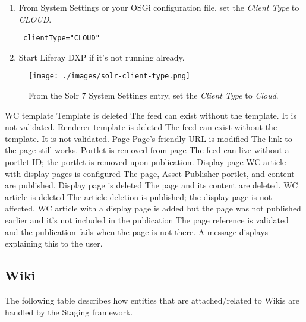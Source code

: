 \begin{enumerate}
\def\labelenumi{\arabic{enumi}.}
\item
  From System Settings or your OSGi configuration file, set the
  \emph{Client Type} to \emph{CLOUD}.

\begin{verbatim}
 clientType="CLOUD"
\end{verbatim}
\item
  Start Liferay DXP if it's not running already.
\end{enumerate}

\begin{figure}
\centering
\texttt{[image: ./images/solr-client-type.png]}
\caption{From the Solr 7 System Settings entry, set the \emph{Client
Type} to \emph{Cloud}.}
\end{figure}

WC template \textbar{} Template is deleted \textbar{} The feed can exist
without the template. It is not validated. \textbar{} Renderer template
is deleted \textbar{} The feed can exist without the template. It is not
validated. Page \textbar{} Page's friendly URL is modified \textbar{}
The link to the page still works. \textbar{} Portlet is removed from
page \textbar{} The feed can live without a portlet ID; the portlet is
removed upon publication. Display page \textbar{} WC article with
display pages is configured \textbar{} The page, Asset Publisher
portlet, and content are published. \textbar{} Display page is deleted
\textbar{} The page and its content are deleted. \textbar{} WC article
is deleted \textbar{} The article deletion is published; the display
page is not affected. \textbar{} WC article with a display page is added
but the page was not published earlier and it's not included in the
publication \textbar{} The page reference is validated and the
publication fails when the page is not there. A message displays
explaining this to the user.

\noindent\hrulefill

\subsection{Wiki}\label{wiki}

The following table describes how entities that are attached/related to
Wikis are handled by the Staging framework.

\noindent\hrulefill

